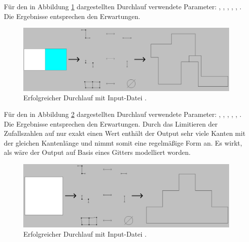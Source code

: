 Für den in Abbildung \ref{fig:square_double_success} dargestellten Durchlauf verwendete Parameter: , , ,
, , . Die Ergebnisse entsprechen den Erwartungen.
\begin{figure}[H]
    \centering
    \includegraphics[width=\textwidth]{images/square_double_success.png}
    \caption{Erfolgreicher Durchlauf mit Input-Datei .}
    \label{fig:square_double_success}
\end{figure}

Für den in Abbildung \ref{fig:square_success} dargestellten Durchlauf verwendete Parameter: , , ,
, , . Die Ergebnisse entsprechen den Erwartungen. Durch das Limitieren der Zufallszahlen auf nur
exakt einen Wert enthält der Output sehr viele Kanten mit der gleichen Kantenlänge und nimmt somit eine regelmäßige Form an. Es wirkt, als wäre der Output auf
Basis eines Gitters modelliert worden.
\begin{figure}[H]
    \centering
    \includegraphics[width=\textwidth]{images/square_success.png}
    \caption{Erfolgreicher Durchlauf mit Input-Datei .}
    \label{fig:square_success}
\end{figure}

